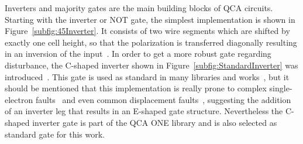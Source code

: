 Inverters and majority gates are the main building blocks of QCA circuits. Starting with the inverter or NOT gate, the simplest implementation is shown in Figure~\ref{subfig:45Inverter}. It consists of two wire segments which are shifted by exactly one cell height, so that the polarization is transferred diagonally resulting in an inversion of the input~\cite{Sasamal2020QuantumDotCA}. In order to get a more robust gate regarding disturbance, the C-shaped inverter shown in Figure~\ref{subfig:StandardInverter} was introduced~\cite{QCA_scl}. This gate is used as standard in many libraries and works~\cite{peng2020spars, fontes, sequential_cell_one, USE}, but it should be mentioned that this implementation is really prone to complex single-electron faults~\cite{SingelElectronFaults} and even common displacement faults~\cite{Inverter_displacements}, suggesting the addition of an inverter leg that results in an E-shaped gate structure. Nevertheless the C-shaped inverter gate is part of the QCA ONE library and is also selected as standard gate for this work.
